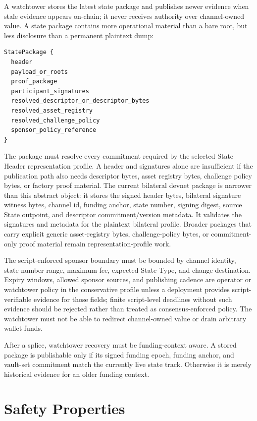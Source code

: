 \documentclass[a4paper,11pt]{article}
\begin{document}
A watchtower stores the latest state package and publishes newer evidence when stale evidence appears on-chain; it never receives authority over channel-owned value. A state package contains more operational material than a bare root, but less disclosure than a permanent plaintext dump:
\begin{lstlisting}
StatePackage {
  header
  payload_or_roots
  proof_package
  participant_signatures
  resolved_descriptor_or_descriptor_bytes
  resolved_asset_registry
  resolved_challenge_policy
  sponsor_policy_reference
}
\end{lstlisting}
The package must resolve every commitment required by the selected State Header
representation profile. A header and signatures alone are insufficient if the
publication path also needs descriptor bytes, asset registry bytes, challenge
policy bytes, or factory proof material.
The current bilateral devnet package is narrower than this abstract object: it
stores the signed header bytes, bilateral signature witness bytes, channel id,
funding anchor, state number, signing digest, source State outpoint, and
descriptor commitment/version metadata. It validates the signatures and metadata
for the plaintext bilateral profile. Broader packages that carry explicit
generic asset-registry bytes, challenge-policy bytes, or commitment-only proof
material remain representation-profile work.

The script-enforced sponsor boundary must be bounded by channel identity, state-number range, maximum fee, expected State Type, and change destination. Expiry windows, allowed sponsor sources, and publishing cadence are operator or watchtower policy in the conservative profile unless a deployment provides script-verifiable evidence for those fields; finite script-level deadlines without such evidence should be rejected rather than treated as consensus-enforced policy. The watchtower must not be able to redirect channel-owned value or drain arbitrary wallet funds.

After a splice, watchtower recovery must be funding-context aware. A stored package is publishable only if its signed funding epoch, funding anchor, and vault-set commitment match the currently live state track. Otherwise it is merely historical evidence for an older funding context.

\clearpage
\section{Safety Properties}
\end{document}
